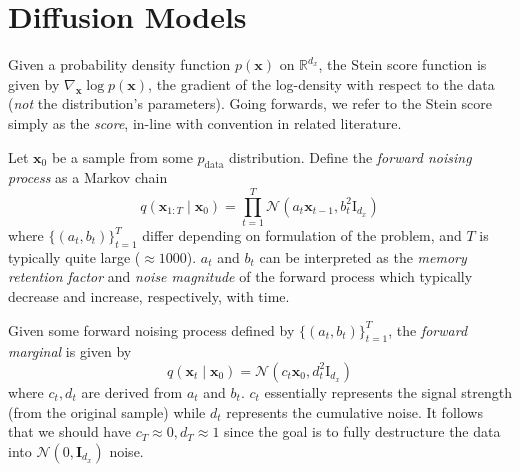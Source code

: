 \section{Diffusion Models}\label{sec:diffusion-models}

\begin{definition} \label{def:stein-score}
    Given a probability density function $p(\mathbf{x})$ on $\mathbb{R}^{d_x}$, the Stein score
    function is given by $\nabla_{\mathbf{x}} \log p(\mathbf{x})$, the gradient of the log-density
    with respect to the data (\emph{not} the distribution's parameters).
    Going forwards, we refer to the Stein score simply as the \emph{score}, in-line with convention in
    related literature.
\end{definition}

\begin{definition} \label{def:forward-process}
    Let $\mathbf{x}_0$ be a sample from some $p_{\text{data}}$ distribution. Define the
    \emph{forward noising process} as a Markov chain
    \begin{equation*}
    q(\mathbf{x}_{1:T} \mid \mathbf{x}_0) = \prod_{t=1}^T \mathcal{N}\left(a_t \mathbf{x}_{t-1}, b_t^2\mathrm{I}_{d_x}\right) \label{eq:fwd}
    \end{equation*}
    where $\{(a_t, b_t)\}_{t=1}^T$ differ depending on formulation of the problem, and $T$ is
    typically quite large ($\approx 1000$). $a_t$ and $b_t$ can be interpreted as the
    \emph{memory retention factor} and \emph{noise magnitude} of the forward process which typically
    decrease and increase, respectively, with time.
\end{definition}

\begin{definition}
    Given some forward noising process defined by $\{(a_t, b_t)\}_{t=1}^T$, the
    \emph{forward marginal} is given by
    $$
    q(\mathbf{x}_t \mid \mathbf{x}_0) = \mathcal{N}(c_t\mathbf{x}_0, d_t^2\mathrm{I}_{d_x})
    $$
    where $c_t, d_t$ are derived from $a_t$ and $b_t$. $c_t$ essentially represents the signal
    strength (from the original sample) while $d_t$ represents the cumulative noise. It follows that
    we should have $c_T \approx 0, d_T \approx 1$ since the goal is to fully destructure the data
    into $\mathcal{N}(0, \mathbf{I}_{d_x})$ noise.
\end{definition}

